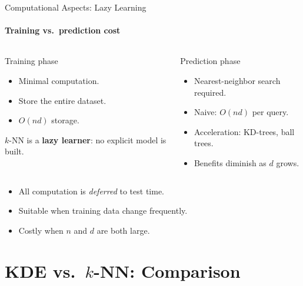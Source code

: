 \begin{frame}{Computational Aspects: Lazy Learning}
  \framesubtitle{Training vs.\ prediction cost}
  \begin{columns}[T]
      \begin{block}{Training phase}
        \begin{itemize}
          \item Minimal computation.
          \item Store the entire dataset.
          \item $O(nd)$ storage.
        \end{itemize}
        $k$-NN is a \textbf{lazy learner}: no explicit model is built.
      \end{block}
      \begin{block}{Prediction phase}
        \begin{itemize}
          \item Nearest-neighbor search required.
          \item Naive: $O(nd)$ per query.
          \item Acceleration: KD-trees, ball trees.
          \item Benefits diminish as $d$ grows.
        \end{itemize}
      \end{block}
  \end{columns}
  \bigskip
  \begin{itemize}
    \item All computation is \emph{deferred} to test time.
    \item Suitable when training data change frequently.
    \item Costly when $n$ and $d$ are both large.
  \end{itemize}
\end{frame}

\section{KDE vs.\ $k$-NN: Comparison}

